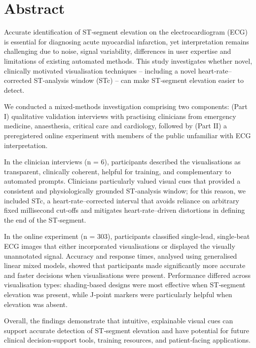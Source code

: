 \documentclass[
  10pt,
  letterpaper,
]{article}
\begin{document}
\section*{Abstract}
Accurate identification of ST‑segment elevation on the electrocardiogram
(ECG) is essential for diagnosing acute myocardial infarction, yet
interpretation remains challenging due to noise, signal variability,
differences in user expertise and limitations of existing automated
methods. This study investigates whether novel, clinically motivated
visualisation techniques -- including a novel heart‑rate--corrected
ST‑analysis window (STc) -- can make ST‑segment elevation easier to
detect.

We conducted a mixed‑methods investigation comprising two components:
(Part I) qualitative validation interviews with practising clinicians
from emergency medicine, anaesthesia, critical care and cardiology,
followed by (Part II) a preregistered online experiment with members of
the public unfamiliar with ECG interpretation.

In the clinician interviews (n = 6), participants described the
visualisations as transparent, clinically coherent, helpful for
training, and complementary to automated prompts. Clinicians
particularly valued visual cues that provided a consistent and
physiologically grounded ST‑analysis window; for this reason, we
included STc, a heart‑rate--corrected interval that avoids reliance on
arbitrary fixed millisecond cut-offs and mitigates heart‑rate--driven
distortions in defining the end of the ST‑segment.

In the online experiment (n = 303), participants classified single‑lead,
single‑beat ECG images that either incorporated visualisations or
displayed the visually unannotated signal. Accuracy and response times,
analysed using generalised linear mixed models, showed that participants
made significantly more accurate and faster decisions when
visualisations were present. Performance differed across visualisation
types: shading‑based designs were most effective when ST‑segment
elevation was present, while J‑point markers were particularly helpful
when elevation was absent.

Overall, the findings demonstrate that intuitive, explainable visual
cues can support accurate detection of ST‑segment elevation and have
potential for future clinical decision‑support tools, training
resources, and patient‑facing applications.
\end{document}
